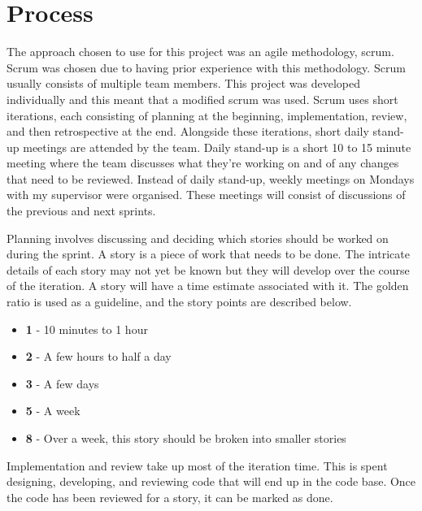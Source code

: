 \section{Process}
\label{sec:process}
The approach chosen to use for this project was an agile methodology, scrum. Scrum was chosen due to having prior experience with this methodology. Scrum usually consists of multiple team members. This project was developed individually and this meant that a modified scrum was used. Scrum uses short iterations, each consisting of planning at the beginning, implementation, review, and then retrospective at the end. Alongside these iterations, short daily stand-up meetings are attended by the team. Daily stand-up is a short 10 to 15 minute meeting where the team discusses what they're working on and of any changes that need to be reviewed. Instead of daily stand-up, weekly meetings on Mondays with my supervisor were organised. These meetings will consist of discussions of the previous and next sprints.

Planning involves discussing and deciding which stories should be worked on during the sprint. A story is a piece of work that needs to be done. The intricate details of each story may not yet be known but they will develop over the course of the iteration. A story will have a time estimate associated with it. The golden ratio is used as a guideline, and the story points are described below.

\begin{itemize}
  \item \textbf{1} - 10 minutes to 1 hour
  \item \textbf{2} - A few hours to half a day
  \item \textbf{3} - A few days
  \item \textbf{5} - A week
  \item \textbf{8} - Over a week, this story should be broken into smaller stories
\end{itemize}

Implementation and review take up most of the iteration time. This is spent designing, developing, and reviewing code that will end up in the code base. Once the code has been reviewed for a story, it can be marked as done. 


